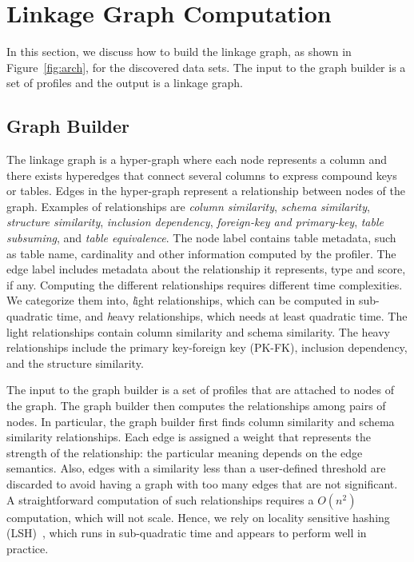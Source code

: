 \section{Linkage Graph Computation}
\label{sec:stitching}
In this section, we discuss how to build the linkage graph, as shown in
Figure~\ref{fig:arch}, for the discovered data sets. The input to the graph
builder is a set of profiles and the output is a linkage graph.

\subsection{Graph Builder}
\label{subsec:graphbuild}

The linkage graph is a hyper-graph
where each node represents a column and there exists hyperedges that connect
several columns to express compound keys or tables. Edges in the hyper-graph
represent a relationship between nodes of the graph. Examples of relationships are 
\emph{column similarity}, 
\emph{schema similarity}, 
\emph{structure similarity}, %
\emph{inclusion dependency}, 
\emph{foreign-key and primary-key}, 
\emph{table subsuming}, and 
\emph{table equivalence}. 
The node label contains table metadata, such as table name, cardinality and
other information computed by the profiler. The edge label includes metadata
about the relationship it represents, \eg type and score, if any. Computing
the different relationships requires different time complexities. We 
categorize them into, {\textit light relationships}, which can be computed in
sub-quadratic time, and {\textit heavy relationships}, which needs at least
quadratic time. The light relationships contain column similarity and schema
similarity. The heavy relationships include the primary key-foreign key
(PK-FK), inclusion dependency, and the structure similarity. 

The input to the graph builder is a set of profiles that are attached to nodes
of the graph.  The graph builder then computes the relationships among pairs of
nodes. In particular, the graph builder first finds column similarity and
schema similarity relationships.  Each edge is assigned a weight that represents
the strength of the relationship: the particular meaning depends on the edge
semantics.  Also, edges with a similarity less than a user-defined threshold are
discarded to avoid having a graph with too many edges that are not significant.
A straightforward computation of such relationships requires a $O(n^2)$
computation, which will not scale.  Hence, we rely on locality sensitive hashing
(LSH)~\cite{DBLP:conf/compgeom/DatarIIM04}, which runs in sub-quadratic time
and appears to perform well in practice.

